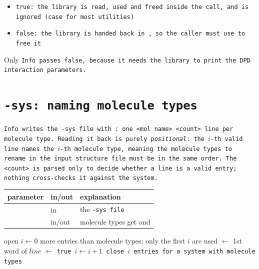 \begin{itemize}[nosep,leftmargin=20pt]
  \item \tt{true}: the library is read, used and freed inside the call, and
     is ignored (case for most utilities)
  \item \tt{false}: the library is handed back in , so the caller
    must use  to free it
\end{itemize}

\noindent
Only \tt{Info} passes \tt{false}, because it needs the library to print the DPD
interaction parameters.

\section{\tt{-sys}: naming molecule types}\label{sec:SysOption}

\tt{Info} writes the \tt{-sys} file with : one \tt{<mol
name> <count>} line per molecule type. Reading it back is purely
\emph{positional}: the $i$-th valid line names the $i$-th molecule type, meaning
the molecule types to rename in the input structure file must be in the same
order. The \tt{<count>} is parsed only to decide whether a line is a valid
entry; nothing cross-checks it against the system.

\begin{longtable}{L{0.30\textwidth}Mp{0.545\textwidth}}
  \toprule
  parameter & in/out & explanation \\
  \midrule
   & in    & the \tt{-sys} file \\
     & in/out& molecule types get  and
     \\
  \bottomrule
\end{longtable}

\begin{algorithmic}[1]
  \St open 
  \St $i \gets 0$
      \Continue{}
    \EndIf
      \Warn more entries than molecule types; only the first $i$ are used
      \Break
    \EndIf
    \St {} $\gets$ 1st word of $line$
    \St {} $\gets$ \tt{true}
    \St $i \gets i + 1$
  \EndWhile
  \St close 
    \Warn $i$ entries for a system with  molecule types
  \EndIf
\end{algorithmic}
\algbottomrule

